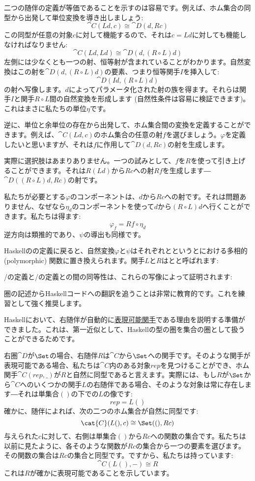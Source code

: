 二つの随伴の定義が等価であることを示すのは容易です。例えば、ホム集合の同型から出発して単位変換を導き出しましょう: 
\[\cat{C}(L d, c) \cong \cat{D}(d, R c)\]
この同型が任意の対象$c$に対して機能するので、それは$c = L d$に対しても機能しなければなりません: 
\[\cat{C}(L d, L d) \cong \cat{D}(d, (R \circ L) d)\]
左側には少なくとも一つの射、恒等射が含まれていることがわかります。自然変換はこの射を$\cat{D}(d, (R \circ L) d)$の要素、つまり恒等関手$I$を挿入して: 
\[\cat{D}(I d, (R \circ L) d)\]
の射へ写像します。$d$によってパラメータ化された射の族を得ます。それらは関手$I$と関手$R \circ L$間の自然変換を形成します (自然性条件は容易に検証できます)。これはまさに私たちの単位$\eta$です。

逆に、単位と余単位の存在から出発して、ホム集合間の変換を定義することができます。例えば、$\cat{C}(L d, c)$のホム集合の任意の射$f$を選びましょう。$\varphi$を定義したいと思いますが、それは$f$に作用して$\cat{D}(d, R c)$の射を生成します。

実際に選択肢はあまりありません。一つの試みとして、$f$を$R$を使って引き上げることができます。それは$R (L d)$から$R c$への射$R f$を生成します―$\cat{D}((R \circ L) d, R c)$の射です。

私たちが必要とする$\varphi$のコンポーネントは、$d$から$R c$への射です。それは問題ありません、なぜなら$\eta_d$のコンポーネントを使って$d$から$(R \circ L) d$へ行くことができます。私たちは得ます: 
\[\varphi_f = R f \circ \eta_d\]
逆方向は類推的であり、$\psi$の導出も同様です。

Haskellのの定義に戻ると、自然変換$\varphi$と$\psi$はそれぞれとというとにおける多相的 (polymorphic) 関数に置き換えられます。関手$L$と$R$はとと呼ばれます: 

/の定義と/の定義との間の同等性は、これらの写像によって証明されます: 

圏の記述からHaskellコードへの翻訳を追うことは非常に教育的です。これを練習として強く推奨します。

Haskellにおいて、右随伴が自動的に\hyperref[representable-functors]{表現可能関手}である理由を説明する準備ができました。これは、第一近似として、Haskellの型の圏を集合の圏として扱うことができるためです。

右圏$\cat{D}$が$\Set$の場合、右随伴$R$は$\cat{C}$から$\Set$への関手です。そのような関手が表現可能である場合、私たちは$\cat{C}$内のある対象$\mathit{rep}$を見つけることができ、ホム関手$\cat{C}(\mathit{rep}, \_)$が$R$と自然に同型であると言えます。実際には、もし$R$が$\Set$から$\cat{C}$へのいくつかの関手$L$の右随伴である場合、そのような対象は常に存在します―それは単集合$()$の下での$L$の像です: 
\[\mathit{rep} = L ()\]
確かに、随伴によれば、次の二つのホム集合が自然に同型です: 
\[\cat{C}(L (), c) \cong \Set((), R c)\]
与えられた$c$に対して、右側は単集合$()$から$R c$への関数の集合です。私たちは以前に見たように、各そのような関数が$R c$の集合から一つの要素を選びます。その関数の集合は$R c$の集合と同型です。ですから、私たちは持っています: 
\[\cat{C}(L (), -) \cong R\]
これは$R$が確かに表現可能であることを示しています。

